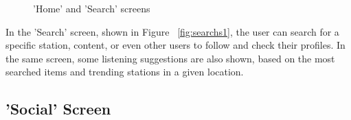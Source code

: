 \begin{figure}[htbp]
	\centering
	 \qquad
	 \qquad
	\caption{'Home' and 'Search' screens}
	\label{fig:mfp1}
\end{figure}

In the 'Search' screen, shown in Figure ~\ref{fig:searchs1}, the user can search for a specific station, content, or even other users to follow and check their profiles. In the same screen, some listening suggestions are also shown, based on the most searched items and trending stations in a given location.


\subsection{'Social' Screen}

